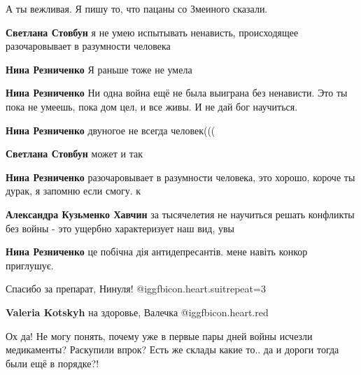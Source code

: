  
 
 
 
 
\zzSecCmt

\begin{itemize} %

А ты вежливая. Я пишу то, что пацаны со Змеиного сказали.

\begin{itemize} %
\textbf{Светлана Стовбун} я не умею испытывать ненависть, происходящее разочаровывает в разумности человека

\textbf{Нина Резниченко} Я раньше тоже не умела

\textbf{Нина Резниченко} Ни одна война ещё не была выиграна без ненависти. Это ты пока не умеешь, пока дом цел, и все живы. И не дай бог научиться.

\textbf{Нина Резниченко} двуногое не всегда человек(((

\textbf{Светлана Стовбун} может и так

\textbf{Нина Резниченко} разочаровывает в разумности человека, это хорошо, короче ты дурак, я запомню если смогу.
к

\textbf{Александра Кузьменко Хавчин} за тысячелетия не научиться решать конфликты без войны - это ущербно характеризует наш вид, увы

\textbf{Нина Резниченко} це побічна дія антидепресантів. мене навіть конкор приглушує.

\end{itemize} %

Спасибо за препарат, Нинуля! @igg{fbicon.heart.suit}{repeat=3}

\textbf{Valeria Kotskyh} на здоровье, Валечка @igg{fbicon.heart.red}


Ох да! Не могу понять, почему уже в первые пары дней войны исчезли медикаменты?
Раскупили впрок? Есть же склады какие то.. да и дороги тогда были ещё в
порядке?!


\end{itemize}

